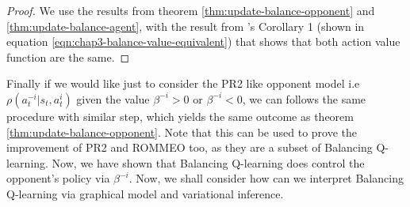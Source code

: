 \begin{proof}
We use the results from theorem \ref{thm:update-balance-opponent} and \ref{thm:update-balance-agent}, with the result from \cite{grau2018balancing}'s Corollary 1 (shown in equation \ref{eqn:chap3-balance-value-equivalent}) that shows that both action value function are the same.
\end{proof}
Finally if we would like just to consider the PR2 like opponent model i.e $\rho(a^{-i}_t | s_t, a^i_t)$ given the value $\beta^{-i} > 0$ or $\beta^{-i} < 0$, we can follows the same procedure with similar step, which yields the same outcome as theorem \ref{thm:update-balance-opponent}. Note that this can be used to prove the improvement of PR2 and ROMMEO too, as they are a subset of Balancing Q-learning. Now, we have shown that Balancing Q-learning does control the opponent's policy via $\beta^{-i}$. Now, we shall consider how can we interpret Balancing Q-learning via graphical model and variational inference.